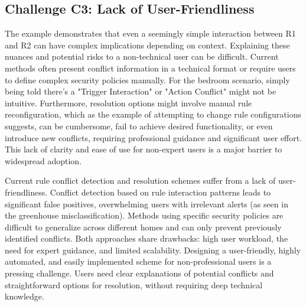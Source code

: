 \subsection{Challenge C3: Lack of User-Friendliness}

The example demonstrates that even a seemingly simple interaction between R1 and R2 can have complex implications depending on context. Explaining these nuances and potential risks to a non-technical user can be difficult. Current methods often present conflict information in a technical format or require users to define complex security policies manually. For the bedroom scenario, simply being told there's a "Trigger Interaction" or "Action Conflict" might not be intuitive. Furthermore, resolution options might involve manual rule reconfiguration, which as the example of attempting to change rule configurations suggests, can be cumbersome, fail to achieve desired functionality, or even introduce new conflicts, requiring professional guidance and significant user effort. This lack of clarity and ease of use for non-expert users is a major barrier to widespread adoption.

Current rule conflict detection and resolution schemes suffer from a lack of user-friendliness. Conflict detection based on rule interaction patterns leads to significant false positives, overwhelming users with irrelevant alerts (as seen in the greenhouse misclassification). Methods using specific security policies are difficult to generalize across different homes and can only prevent previously identified conflicts. Both approaches share drawbacks: high user workload, the need for expert guidance, and limited scalability. Designing a user-friendly, highly automated, and easily implemented scheme for non-professional users is a pressing challenge. Users need clear explanations of potential conflicts and straightforward options for resolution, without requiring deep technical knowledge.

